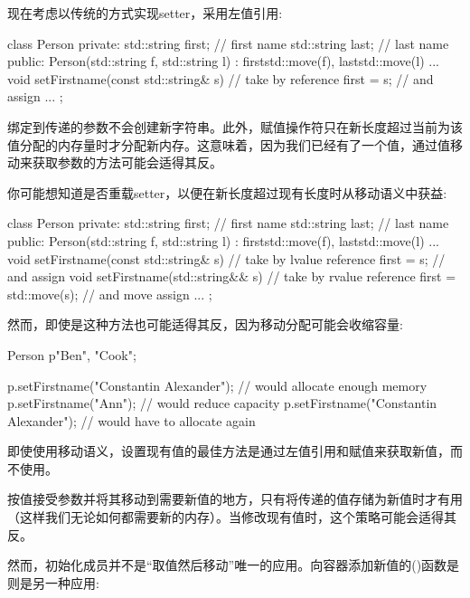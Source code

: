 现在考虑以传统的方式实现setter，采用左值引用:

\begin{cppcode}
class Person {
private:
	std::string first; // first name
	std::string last; // last name
public:
	Person(std::string f, std::string l)
	: first{std::move(f)}, last{std::move(l)} {
	}
	...
	void setFirstname(const std::string& s) { // take by reference
		first = s; // and assign
	}
	...
};
\end{cppcode}

绑定到传递的参数不会创建新字符串。此外，赋值操作符只在新长度超过当前为该值分配的内存量时才分配新内存。这意味着，因为我们已经有了一个值，通过值移动来获取参数的方法可能会适得其反。

你可能想知道是否重载setter，以便在新长度超过现有长度时从移动语义中获益:

\begin{cppcode}
class Person {
private:
	std::string first; // first name
	std::string last; // last name
public:
	Person(std::string f, std::string l)
	: first{std::move(f)}, last{std::move(l)} {
	}
	...
	void setFirstname(const std::string& s) { // take by lvalue reference
		first = s; // and assign
	}
	void setFirstname(std::string&& s) { // take by rvalue reference
		first = std::move(s); // and move assign
	}
	...
};
\end{cppcode}

然而，即使是这种方法也可能适得其反，因为移动分配可能会收缩容量:

\begin{cppcode}
Person p{"Ben", "Cook"};

p.setFirstname("Constantin Alexander"); // would allocate enough memory
p.setFirstname("Ann"); // would reduce capacity
p.setFirstname("Constantin Alexander"); // would have to allocate again
\end{cppcode}

即使使用移动语义，设置现有值的最佳方法是通过左值引用和赋值来获取新值，而不使用。

按值接受参数并将其移动到需要新值的地方，只有将传递的值存储为新值时才有用（这样我们无论如何都需要新的内存）。当修改现有值时，这个策略可能会适得其反。

然而，初始化成员并不是“取值然后移动”唯一的应用。向容器添加新值的()函数是则是另一种应用:


